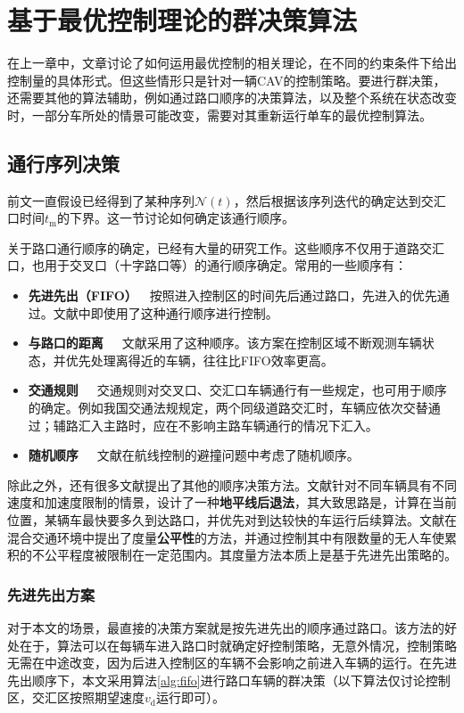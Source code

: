 \chapter{基于最优控制理论的群决策算法}
在上一章中，文章讨论了如何运用最优控制的相关理论，在不同的约束条件下给出控制量的具体形式。但这些情形只是针对一辆CAV的控制策略。要进行群决策，还需要其他的算法辅助，例如通过路口顺序的决策算法，以及整个系统在状态改变时，一部分车所处的情景可能改变，需要对其重新运行单车的最优控制算法。

\section{通行序列决策}
前文一直假设已经得到了某种序列$\mathcal{N}(t)$，然后根据该序列迭代的确定达到交汇口时间$t_\mathrm{m}$的下界。这一节讨论如何确定该通行顺序。

关于路口通行顺序的确定，已经有大量的研究工作。这些顺序不仅用于道路交汇口，也用于交叉口（十字路口等）的通行顺序确定。常用的一些顺序有：
\begin{itemize}
\item \textbf{先进先出（FIFO）}\ \ 按照进入控制区的时间先后通过路口，先进入的优先通过。文献\cite{Kim2013Collision,Azimi2011Vehicular}中即使用了这种通行顺序进行控制。
\item \textbf{与路口的距离}\ \ \ 文献\cite{Fankhauser2011Collision}采用了这种顺序。该方案在控制区域不断观测车辆状态，并优先处理离得近的车辆，往往比FIFO效率更高。
\item \textbf{交通规则}\ \ \ 交通规则对交叉口、交汇口车辆通行有一些规定，也可用于顺序的确定。例如我国交通法规规定，两个同级道路交汇时，车辆应依次交替通过；辅路汇入主路时，应在不影响主路车辆通行的情况下汇入。
\item \textbf{随机顺序}\ \ \ 文献\cite{Chaloulos2010Distributed}在航线控制的避撞问题中考虑了随机顺序。
\end{itemize}

除此之外，还有很多文献提出了其他的顺序决策方法。文献\cite{Campos2017Traffic}针对不同车辆具有不同速度和加速度限制的情景，设计了一种\textbf{地平线后退法}，其大致思路是，计算在当前位置，某辆车最快要多久到达路口，并优先对到达较快的车运行后续算法。文献\cite{Baselt2014Merging}在混合交通环境中提出了度量\textbf{公平性}的方法，并通过控制其中有限数量的无人车使累积的不公平程度被限制在一定范围内。其度量方法本质上是基于先进先出策略的。

\subsection{先进先出方案}
对于本文的场景，最直接的决策方案就是按先进先出的顺序通过路口。该方法的好处在于，算法可以在每辆车进入路口时就确定好控制策略，无意外情况，控制策略无需在中途改变，因为后进入控制区的车辆不会影响之前进入车辆的运行。在先进先出顺序下，本文采用算法\ref{alg:fifo}进行路口车辆的群决策（以下算法仅讨论控制区，交汇区按照期望速度$v_\mathrm{d}$运行即可）。

